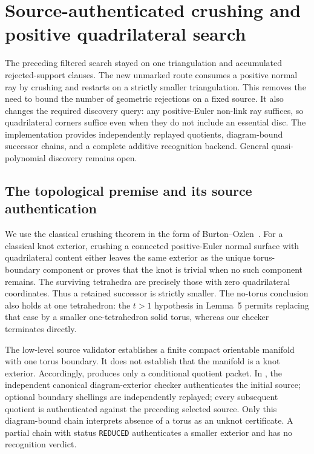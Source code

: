 \section{Source-authenticated crushing and positive quadrilateral search}
\label{sec:normal-crushing-search}

The preceding filtered search stayed on one triangulation and accumulated
rejected-support clauses.  The new unmarked route consumes a positive normal
ray by crushing and restarts on a strictly smaller triangulation.  This
removes the need to bound the number of geometric rejections on a fixed
source.  It also changes the required discovery query: any positive-Euler
non-link ray suffices, so quadrilateral corners suffice even when they do
not include an essential disc.  The implementation provides independently
replayed quotients, diagram-bound successor chains, and a complete additive
recognition backend.  General quasi-polynomial discovery remains open.

\subsection{The topological premise and its source authentication}

We use the classical crushing theorem in the form of
Burton--Ozlen~\cite[Observations~3--4 and Lemma~5]{burton-ozlen}.
For a classical knot exterior, crushing a connected positive-Euler normal
surface with quadrilateral content either leaves the same exterior as the
unique torus-boundary component or proves that the knot is trivial when no
such component remains.  The surviving tetrahedra are precisely those with
zero quadrilateral coordinates.  Thus a retained successor is strictly
smaller.  The no-torus conclusion also holds at one tetrahedron: the
$t>1$ hypothesis in Lemma~5 permits replacing that case by a smaller
one-tetrahedron solid torus, whereas our checker terminates directly.

The low-level source validator establishes a finite compact orientable
manifold with one torus boundary.  It does not establish that the manifold
is a knot exterior.  Accordingly,  produces only
a conditional quotient packet.  In , the
independent canonical diagram-exterior checker authenticates the initial
source; optional boundary shellings are independently replayed; every
subsequent quotient is authenticated against the preceding selected source.
Only this diagram-bound chain interprets absence of a torus as an unknot
certificate.  A partial chain with status \texttt{REDUCED} authenticates a
smaller exterior and has no recognition verdict.

